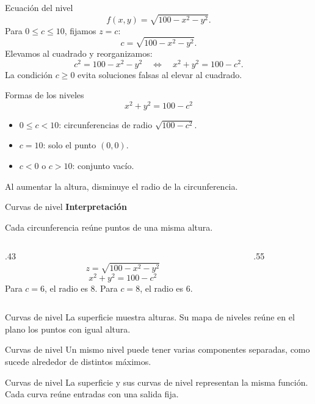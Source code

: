 \begin{frame}{Ecuación del nivel}
\[f(x,y)=\sqrt{100-x^2-y^2}.\]
Para $0\le c\le10$, fijamos $z=c$:
\[c=\sqrt{100-x^2-y^2}.\]
Elevamos al cuadrado y reorganizamos:
\[c^2=100-x^2-y^2\quad\Longleftrightarrow\quad x^2+y^2=100-c^2.\]
La condición $c\ge0$ evita soluciones falsas al elevar al cuadrado.
\end{frame}
\begin{frame}{Formas de los niveles}
\[x^2+y^2=100-c^2\]
\begin{itemize}
\item $0\le c<10$: circunferencias de radio $\sqrt{100-c^2}$.
\item $c=10$: solo el punto $(0,0)$.
\item $c<0$ o $c>10$: conjunto vacío.
\end{itemize}
Al aumentar la altura, disminuye el radio de la circunferencia.
\end{frame}
\begin{frame}{Curvas de nivel}
\textbf{Interpretación}\par
Cada circunferencia reúne puntos de una misma altura.
\begin{columns}[c]
\begin{column}{.43\textwidth}
\[z=\sqrt{100-x^2-y^2}\]
\[x^2+y^2=100-c^2\]
Para $c=6$, el radio es $8$.
\medskip
Para $c=8$, el radio es $6$.
\end{column}
\begin{column}{.55\textwidth}\end{column}
\end{columns}
\end{frame}
\begin{frame}{Curvas de nivel}
La superficie muestra alturas. Su mapa de niveles reúne en el plano los puntos con igual altura.
\end{frame}
\begin{frame}{Curvas de nivel}
Un mismo nivel puede tener varias componentes separadas, como sucede alrededor de distintos máximos.
\end{frame}
\begin{frame}{Curvas de nivel}
La superficie y sus curvas de nivel representan la misma función. Cada curva reúne entradas con una salida fija.
\end{frame}
